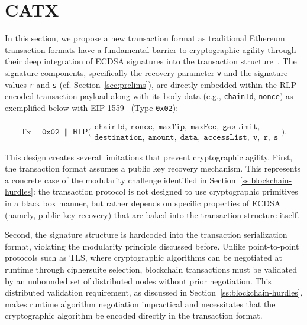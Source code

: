 \section{CATX}\label{s:catx}


In this section, we propose a new transaction format as traditional Ethereum transaction formats have a fundamental barrier to cryptographic agility through their deep integration of ECDSA signatures into the transaction structure~\cite{eip1559}. 
The signature components, specifically the recovery parameter \texttt{v} and the signature values \texttt{r} and \texttt{s} (cf. Section~\ref{sec:prelims}), are directly embedded within the RLP-encoded transaction payload along with its body data (e.g., \texttt{chainId}, \texttt{nonce}) as exemplified below with EIP-1559~\cite{eip1559} (Type \texttt{0x02}):

\begin{equation*}\label{eq:eip1559-tx}
\text{Tx} = \texttt{0x02} \;\|\; 
\mathsf{RLP}\Bigg(
\begin{matrix}
\texttt{chainId},\; \texttt{nonce},\; \texttt{maxTip},\; \texttt{maxFee},\; \texttt{gasLimit},\\
\texttt{destination},\; \texttt{amount},\; \texttt{data},\; \texttt{accessList},\; 
\texttt{v},\; \texttt{r},\; \texttt{s}
\end{matrix}
\Bigg).
\end{equation*}

This design creates several limitations that prevent cryptographic agility. 
First, the transaction format assumes a public key recovery mechanism. 
This represents a concrete case of the modularity challenge identified in Section~\ref{ss:blockchain-hurdles}: the transaction protocol is not designed to use cryptographic primitives in a black box manner, but rather depends on specific properties of ECDSA (namely, public key recovery) that are baked into the transaction structure itself.

Second, the signature structure is hardcoded into the transaction serialization format, violating the modularity principle discussed before. 
Unlike point-to-point protocols such as TLS, where cryptographic algorithms can be negotiated at runtime through ciphersuite selection, blockchain transactions must be validated by an unbounded set of distributed nodes without prior negotiation. This distributed validation requirement, as discussed in Section~\ref{ss:blockchain-hurdles}, makes runtime algorithm negotiation impractical and necessitates that the cryptographic algorithm be encoded directly in the transaction format.

